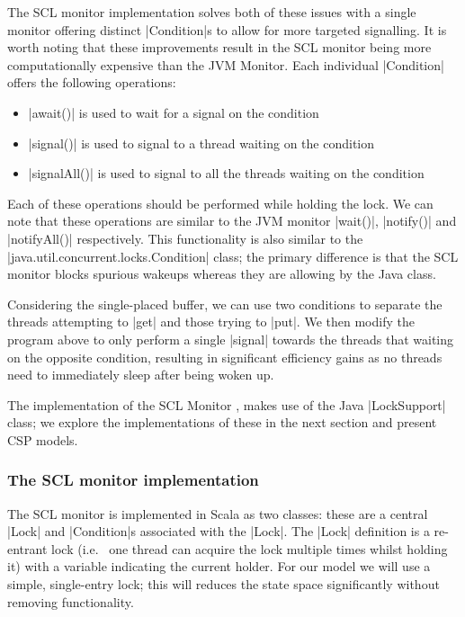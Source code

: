 The SCL monitor implementation solves both of these issues with a single monitor offering  distinct |Condition|s to allow for more targeted signalling. It is worth noting that these improvements result in the SCL monitor being more computationally expensive than the JVM Monitor. Each individual |Condition| offers the following operations:
\begin{itemize}
  \item |await()| is used to wait for a signal on the condition
  \item |signal()| is used to signal to a thread waiting on the condition
  \item |signalAll()| is used to signal to all the threads waiting on the condition
\end{itemize}
Each of these operations should be performed while holding the lock. We can note that these operations are similar to the JVM monitor |wait()|, |notify()| and |notifyAll()| respectively. This functionality is also similar to the |java.util.concurrent.locks.Condition| class; the primary difference is that the SCL monitor blocks spurious wakeups whereas they are allowing by the Java class. %

Considering the single-placed buffer, we can use two conditions to separate the threads attempting to |get| and those trying to |put|. We then modify the program above to only perform a single |signal| towards the threads that waiting on the opposite condition, resulting in significant efficiency gains as no threads need to immediately sleep after being woken up.

The implementation of the SCL Monitor \cite{GitHub}, makes use of the Java |LockSupport| class; we explore the implementations of these in the next section and present CSP models.  

\subsubsection{The SCL monitor implementation}

The SCL monitor is implemented in Scala as two classes: these are a central |Lock| and |Condition|s associated with the |Lock|. The |Lock| definition is a re-entrant lock (i.e.~ one thread can acquire the lock multiple times whilst holding it) with a variable indicating the current holder. For our model we will use a simple, single-entry lock; this will reduces the state space significantly without removing functionality.

